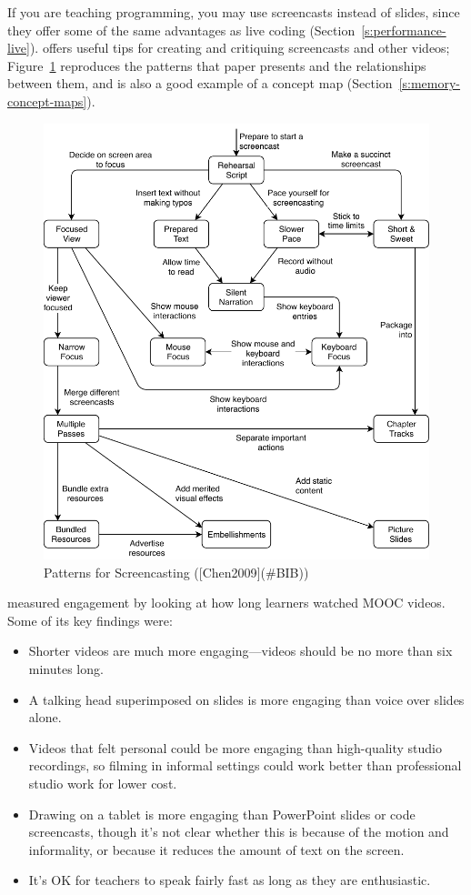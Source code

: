 If you are teaching programming, you may use screencasts instead of
slides, since they offer some of the same advantages as live coding
(Section~\ref{s:performance-live}). \cite{Chen2009} offers useful tips
for creating and critiquing screencasts and other videos;
Figure~\ref{f:online-screencasting} reproduces the patterns that paper
presents and the relationships between them, and is also a good example
of a concept map (Section~\ref{s:memory-concept-maps}).

\begin{figure}
\centering
\includegraphics{../../figures/screencast.pdf}
\caption{Patterns for Screencasting ({[}Chen2009{]}(\#BIB))}
\label{f:online-screencasting}
\end{figure}

\cite{Guo2014} measured engagement by looking at how long learners
watched MOOC videos. Some of its key findings were:

\begin{itemize}
\item
  Shorter videos are much more engaging---videos should be no more than
  six minutes long.
\item
  A talking head superimposed on slides is more engaging than voice
  over slides alone.
\item
  Videos that felt personal could be more engaging than high-quality
  studio recordings, so filming in informal settings could work better
  than professional studio work for lower cost.
\item
  Drawing on a tablet is more engaging than PowerPoint slides or code
  screencasts, though it's not clear whether this is because of the
  motion and informality, or because it reduces the amount of text on
  the screen.
\item
  It's OK for teachers to speak fairly fast as long as they are
  enthusiastic.
\end{itemize}


